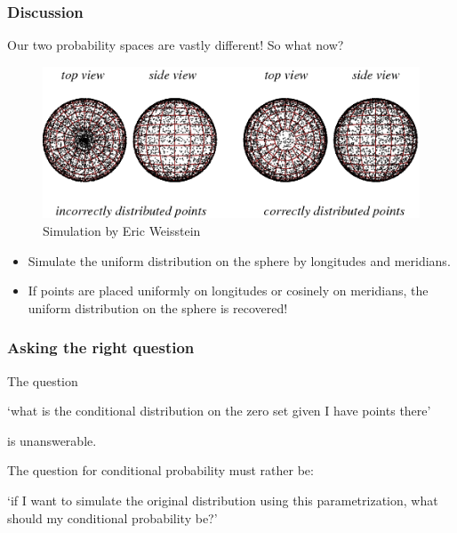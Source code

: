 \documentclass{beamer}
\theoremstyle{plain}
\theoremstyle{definition}
\theoremstyle{remark}
\newcommand{\1}{\mathbbm{1}}
\begin{document}
\begin{frame}
\frametitle{Discussion}
Our two probability spaces are vastly different! So what now?

\begin{figure}[b]
\begin{center}
\includegraphics[width=0.6\linewidth]{SphericalDistribution_900.png}
\end{center}
\caption{Simulation by Eric Weisstein}
\end{figure}

\begin{itemize}
	\item Simulate the uniform distribution on the sphere by longitudes and meridians.
	\item If points are placed uniformly on longitudes or cosinely on meridians, the uniform distribution on the sphere is recovered!
\end{itemize}
\end{frame}
\begin{frame}
\frametitle{Asking the right question}
The question
\begin{alertblock}{}
`what is the conditional distribution on the zero set given I have points there'
\end{alertblock}
is unanswerable.
\vspace{1em}

The question for conditional probability must rather be:
\begin{exampleblock}{}
`if I want to simulate the original distribution using this parametrization, what should my conditional probability be?'
\end{exampleblock}
\end{frame}
\end{document}
